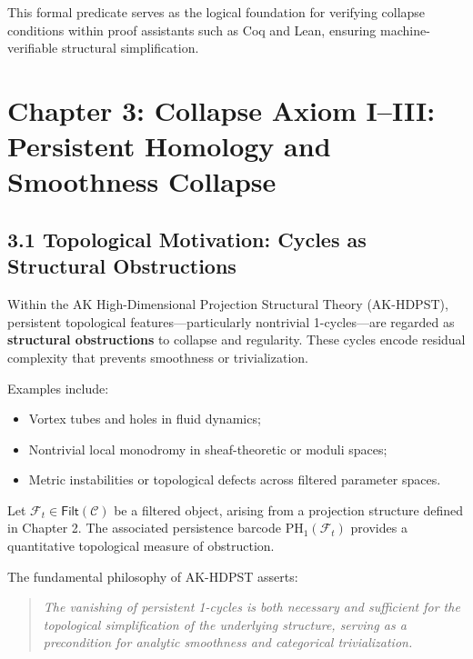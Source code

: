 \documentclass[11pt]{article}
\begin{document}
This formal predicate serves as the logical foundation for verifying collapse conditions within proof assistants such as Coq and Lean, ensuring machine-verifiable structural simplification.



\section{Chapter 3: Collapse Axiom I–III: Persistent Homology and Smoothness Collapse}

\subsection*{3.1 Topological Motivation: Cycles as Structural Obstructions}

Within the AK High-Dimensional Projection Structural Theory (AK-HDPST), persistent topological features—particularly nontrivial 1-cycles—are regarded as \textbf{structural obstructions} to collapse and regularity. These cycles encode residual complexity that prevents smoothness or trivialization.

Examples include:

\begin{itemize}
    \item Vortex tubes and holes in fluid dynamics;
    \item Nontrivial local monodromy in sheaf-theoretic or moduli spaces;
    \item Metric instabilities or topological defects across filtered parameter spaces.
\end{itemize}

Let \( \mathcal{F}_t \in \mathsf{Filt}(\mathcal{C}) \) be a filtered object, arising from a projection structure defined in Chapter 2. The associated persistence barcode \( \mathrm{PH}_1(\mathcal{F}_t) \) provides a quantitative topological measure of obstruction.

The fundamental philosophy of AK-HDPST asserts:

\begin{quote}
\textit{
The vanishing of persistent 1-cycles is both necessary and sufficient for the topological simplification of the underlying structure,  
serving as a precondition for analytic smoothness and categorical trivialization.
}
\end{quote}
\end{document}
